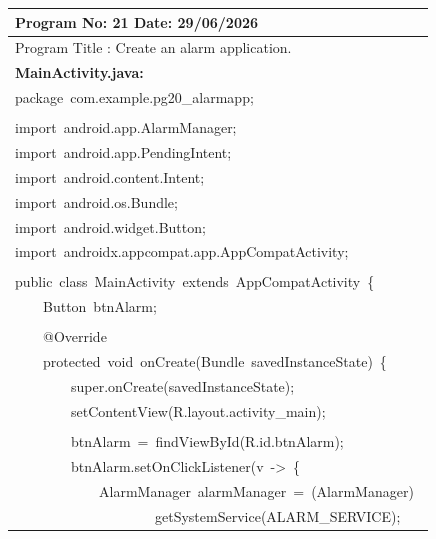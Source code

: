 \documentclass[a4paper,12pt]{article}
\begin{document}
\noindent\begingroup
\renewcommand{\arraystretch}{1.1}
\begin{longtable}{|p{}|}
\hline\endfirsthead\hline\endhead\hline\endfoot\hline\endlastfoot
\rule{0pt}{13pt}Program No: 21 \hfill Date: 29/06/2026 \\
\hline
\rule{0pt}{13pt}Program Title : Create an alarm application. \\
\hline
\rule{0pt}{13pt}\textbf{MainActivity.java:} \\
\hline
{\ttfamily\small package\ com.example.pg20\_alarmapp;} \\
\strut \\
{\ttfamily\small import\ android.app.AlarmManager;} \\
{\ttfamily\small import\ android.app.PendingIntent;} \\
{\ttfamily\small import\ android.content.Intent;} \\
{\ttfamily\small import\ android.os.Bundle;} \\
{\ttfamily\small import\ android.widget.Button;} \\
{\ttfamily\small import\ androidx.appcompat.app.AppCompatActivity;} \\
\strut \\
{\ttfamily\small public\ class\ MainActivity\ extends\ AppCompatActivity\ \{} \\
{\ttfamily\small \ \ \ \ Button\ btnAlarm;} \\
\strut \\
{\ttfamily\small \ \ \ \ @Override} \\
{\ttfamily\small \ \ \ \ protected\ void\ onCreate(Bundle\ savedInstanceState)\ \{} \\
{\ttfamily\small \ \ \ \ \ \ \ \ super.onCreate(savedInstanceState);} \\
{\ttfamily\small \ \ \ \ \ \ \ \ setContentView(R.layout.activity\_main);} \\
\strut \\
{\ttfamily\small \ \ \ \ \ \ \ \ btnAlarm\ =\ findViewById(R.id.btnAlarm);} \\
{\ttfamily\small \ \ \ \ \ \ \ \ btnAlarm.setOnClickListener(v\ -\textgreater{}\ \{} \\
{\ttfamily\small \ \ \ \ \ \ \ \ \ \ \ \ AlarmManager\ alarmManager\ =\ (AlarmManager)\ } \\
{\ttfamily\small \ \ \ \ \ \ \ \ \ \ \ \ \ \ \ \ \ \ \ \ getSystemService(ALARM\_SERVICE);} \\

\end{longtable}
\end{document}
